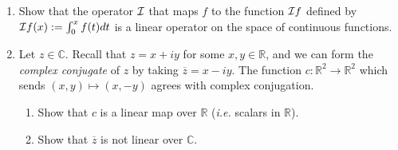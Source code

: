 \begin{enumerate}

  
\item Show that the operator ${\cal I}$ that maps $f$ to the function ${\cal I}f$ defined by ${\cal I}f(x):=\int_0^xf(t)dt$ is a linear operator on the space of continuous functions. 



\item Let $z \in \mathbb{C}$. Recall that  $z = x + iy$ for some $x,y \in \mathbb{R}$, and we can form the \emph{complex conjugate} of $z$ by taking $\overline{z} = x - iy$. 
The function $c \colon \mathbb{R}^2 \rightarrow \mathbb{R}^2$ which sends $(x, y) \mapsto (x, -y)$ agrees with complex conjugation.
\begin{enumerate}
\item Show that $c$ is a linear map over $\mathbb{R}$ ({\itshape i.e.} scalars in $\mathbb{R}$).

\item Show that $\overline{z}$ is not linear over $\mathbb{C}$.
\end{enumerate}

\end{enumerate}

